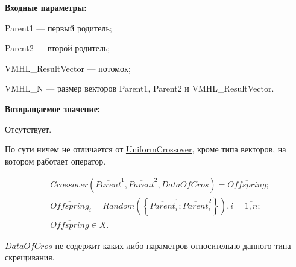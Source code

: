 \textbf{Входные параметры:}
 
 Parent1 --- первый родитель;
 
 Parent2 --- второй родитель;
 
 VMHL\_ResultVector --- потомок;
 
 VMHL\_N --- размер векторов Parent1, Parent2 и VMHL\_ResultVector.

\textbf{Возвращаемое значение:}

 Отсутствует.
 
По сути ничем не отличается от \hyperref[SetOfOperatorsAlgorithms:UniformCrossover]{UniformCrossover}, кроме типа векторов, на котором работает оператор.
 
\begin{align*}
&Crossover \left( \overline{Parent}^1, \overline{Parent}^2, DataOfCros\right) = \overline{Offspring};\\
& \overline{Offspring}_i=Random\left( \left\lbrace \overline{Parent}^1_i;\overline{Parent}^2_i\right\rbrace \right), i=\overline{1,n} ;\nonumber\\
&\overline{Offspring}\in X.\nonumber
\end{align*}

$ DataOfCros $ не содержит каких-либо параметров относительно данного типа скрещивания.